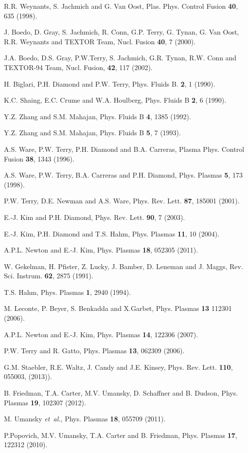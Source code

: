 \documentclass[aip,pop,amsmath,amssymb,reprint,superscriptaddress]{revtex4-1} %
\begin{document}
\begin{thebibliography}{10}
R.R. Weynants, S. Jachmich and G. Van Oost, Plas. Phys. Control Fusion {\bf 40}, 635 (1998).

J. Boedo, D. Gray, S. Jachmich, R. Conn, G.P. Terry, G. Tynan, G. Van Oost, R.R. Weynants and TEXTOR Team, Nucl. Fusion {\bf 40},  7  (2000).

J.A. Boedo, D.S. Gray, P.W.Terry, S. Jachmich, G.R. Tynan, R.W. Conn and TEXTOR-94 Team, Nucl. Fusion, {\bf 42}, 117 (2002).

H. Biglari, P.H. Diamond and P.W. Terry, Phys. Fluids B. {\bf 2},  1  (1990).

K.C. Shaing, E.C. Crume and W.A. Houlberg, Phys. Fluids B {\bf 2}, 6 (1990).

Y.Z. Zhang and S.M. Mahajan, Phys. Fluids B {\bf 4}, 1385 (1992).

Y.Z. Zhang and S.M. Mahajan, Phys. Fluids B {\bf 5}, 7 (1993).

A.S. Ware, P.W. Terry, P.H. Diamond and B.A. Carreras, Plasma Phys. Control Fusion {\bf 38},  1343  (1996).

A.S. Ware, P.W. Terry, B.A. Carreras and P.H. Diamond, Phys. Plasmas {\bf 5}, 173 (1998).

P.W. Terry, D.E. Newman and A.S. Ware, Phys. Rev. Lett. {\bf 87}, 185001  (2001).

E.-J. Kim and P.H. Diamond, Phys. Rev. Lett. {\bf 90}, 7 (2003).

E.-J. Kim, P.H. Diamond and T.S. Hahm, Phys. Plasmas {\bf 11},  10  (2004).

A.P.L. Newton and E.-J. Kim, Phys. Plasmas {\bf 18}, 052305 (2011).

W. Gekelman, H. Pfister, Z. Lucky, J. Bamber, D. Leneman and J. Maggs, Rev. Sci. Instrum. {\bf 62},  2875  (1991).

T.S. Hahm, Phys. Plasmas {\bf 1}, 2940 (1994).

M. Leconte, P. Beyer, S. Benkadda and X.Garbet, Phys. Plasmas {\bf 13} 112301 (2006).

A.P.L. Newton and E.-J. Kim, Phys. Plasmas {\bf 14}, 122306 (2007).

P.W. Terry and R. Gatto, Phys. Plasmas {\bf 13}, 062309 (2006).

G.M. Staebler, R.E. Waltz, J. Candy and J.E. Kinsey, Phys. Rev. Lett. {\bf 110}, 055003, (2013)).

B. Friedman, T.A. Carter, M.V. Umansky, D. Schaffner and B. Dudson, Phys. Plasmas {\bf 19}, 102307 (2012).

M. Umansky {\it et~al.}, Phys. Plasmas {\bf 18},  055709  (2011).

P.Popovich, M.V. Umansky, T.A. Carter and B. Friedman, Phys. Plasmas {\bf 17}, 122312 (2010).

\end{thebibliography}
\end{document}
